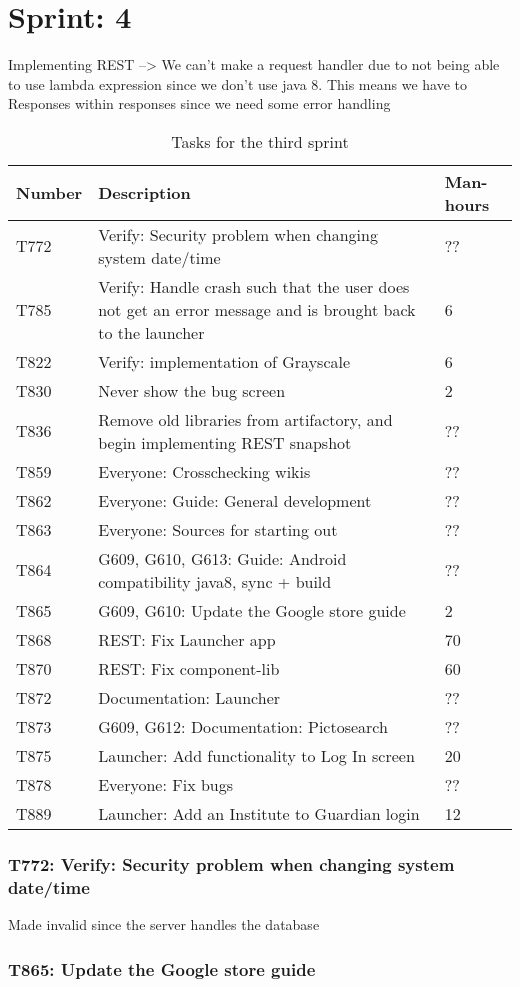 \chapter{Sprint: 4}


Implementing REST --> We can't make a request handler due to not being able to
use lambda expression since we don't use java 8.
This means we have to Responses within responses since we need some error
handling

\begin{table}[H]
\begin{centering}
\begin{tabular}{|l|p{9cm}|l|}
\hline
Number 	& Description & Man-hours \\ \hline
T772    & Verify: Security problem when changing system date/time & ??\\\hline
T785	& Verify: Handle crash such that the user does not get an error message and
is brought back to the launcher & 6\\ \hline
T822    & Verify: implementation of Grayscale & 6\\\hline
T830    & Never show the bug screen & 2 \\\hline
T836	& Remove old libraries from artifactory, and begin implementing REST
snapshot & ??\\\hline
T859   	& Everyone: Crosschecking wikis & ??\\\hline
T862  	& Everyone: Guide: General development & ?? \\ \hline
T863	& Everyone: Sources for starting out & ??\\ \hline
T864	& G609, G610, G613: Guide: Android compatibility java8, sync + build & ??\\
\hline 
T865	& G609, G610: Update the Google store guide & 2\\\hline
T868    & REST: Fix Launcher app & 70 \\\hline
T870    & REST: Fix component-lib & 60\\\hline
T872 	& Documentation: Launcher & ??\\ \hline
T873 	& G609, G612: Documentation: Pictosearch & ??\\ \hline
T875 	& Launcher: Add functionality to Log In screen & 20\\\hline 
T878 	& Everyone: Fix bugs & ??\\ \hline
T889	& Launcher: Add an Institute to Guardian login & 12 \\\hline
\end{tabular}
\caption{Tasks for the third sprint}
\label{Tasks3}
\end{centering}
\end{table}

\subsection{T772: Verify: Security problem when changing system date/time}
Made invalid since the server handles the database

\subsection{T865: Update the Google store guide}



